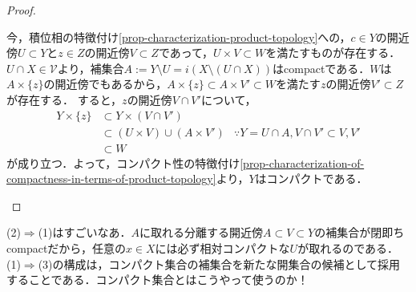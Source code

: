 \documentclass[uplatex,dvipdfmx]{jsreport}
\begin{document}
\begin{proof}
\begin{description}
\begin{description}
            今，積位相の特徴付け\ref{prop-characterization-product-topology}への，$c\in Y$の開近傍$U\subset Y$と$z\in Z$の開近傍$V\subset Z$であって，$U\times V\subset W$を満たすものが存在する．
            $U\cap X\in\mathcal{V}$より，補集合$A:=Y\setminus U=i(X\setminus(U\cap X))$はcompactである．$W$は$A\times\{z\}$の開近傍でもあるから，$A\times\{z\}\subset A\times V'\subset W$を満たす$z$の開近傍$V'\subset Z$が存在する．
            すると，$z$の開近傍$V\cap V'$について，
            \begin{align*}
                Y\times\{z\}&\subset Y\times(V\cap V')\\
                &\subset (U\times V)\cup(A\times V')&\because Y=U\cap A,V\cap V'\subset V,V'\\
                &\subset W
            \end{align*}
            が成り立つ．よって，コンパクト性の特徴付け\ref{prop-characterization-of-compactness-in-terms-of-product-topology}より，$Y$はコンパクトである．
        \end{description}
    \end{description}
\end{proof}
\begin{remarks}
    (2)$\Rightarrow$(1)はすごいなあ．$A$に取れる分離する開近傍$A\subset V\subset Y$の補集合が閉即ちcompactだから，任意の$x\in X$には必ず相対コンパクトな$U$が取れるのである．
    (1)$\Rightarrow$(3)の構成は，コンパクト集合の補集合を新たな開集合の候補として採用することである．コンパクト集合とはこうやって使うのか！
\end{remarks}
\end{document}
